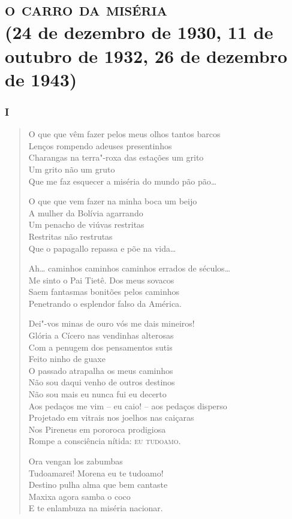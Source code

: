 \part[o carro da miséria]{\textsc{o carro da miséria}\\(24 de dezembro de 1930, 11 de outubro de 1932, 26 de dezembro de 1943)}
\removeepigraph

\section*{I}

\begin{verse}
O que que vêm fazer pelos meus olhos tantos barcos\\
Lenços rompendo adeuses presentinhos\\
Charangas na terra"-roxa das estações um grito\\
Um grito não um gruto\\
Que me faz esquecer a miséria do mundo pão pão\ldots{}

O que que vem fazer na minha boca um beijo\\
A mulher da Bolívia agarrando\\
Um penacho de viúvas restritas\\
Restritas não restrutas\\
Que o papagallo repassa e põe na vida\ldots{}

Ah\ldots{} caminhos caminhos caminhos errados de séculos\ldots{}\\
Me sinto o Pai Tietê. Dos meus sovacos\\
Saem fantasmas bonitões pelos caminhos\\
Penetrando o esplendor falso da América.

Dei"-vos minas de ouro vós me dais mineiros!\\
Glória a Cícero nas vendinhas alterosas\\
Com a penugem dos pensamentos sutis\\
Feito ninho de guaxe\\
O passado atrapalha os meus caminhos\\
Não sou daqui venho de outros destinos\\
Não sou mais eu nunca fui eu decerto\\
Aos pedaços me vim -- eu caio! -- aos pedaços disperso\\
Projetado em vitrais nos joelhos nas caiçaras\\
Nos Pireneus em pororoca prodigiosa\\
Rompe a consciência nítida: \textsc{eu tudoamo.}

Ora vengan los zabumbas\\
Tudoamarei! Morena eu te tudoamo!\\
Destino pulha alma que bem cantaste\\
Maxixa agora samba o coco\\
E te enlambuza na miséria nacionar.
\end{verse}

